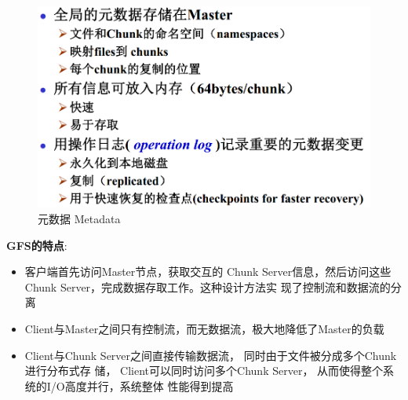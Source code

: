 \documentclass[UTF8,a4paper]{ctexart}
\begin{document}
\begin{figure}[H]
  \centering
  \includegraphics[scale = 0.3]{assets/ParallelComputing_5328a.png}
  \caption{元数据 Metadata}
\end{figure}

\textbf{GFS的特点}:
\begin{itemize}
  \item 客户端首先访问Master节点，获取交互的
Chunk Server信息，然后访问这些Chunk
Server，完成数据存取工作。这种设计方法实
现了控制流和数据流的分离
  \item Client与Master之间只有控制流，而无数据流，极大地降低了Master的负载
  \item Client与Chunk Server之间直接传输数据流，
同时由于文件被分成多个Chunk进行分布式存
储， Client可以同时访问多个Chunk Server，
从而使得整个系统的I/O高度并行，系统整体
性能得到提高
\end{itemize}
\end{document}
